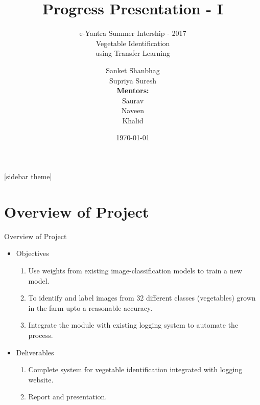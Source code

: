 \documentclass[10pt, a4paper,xcolor=table]{beamer}
\begin{document}
	\title{Progress Presentation - I}
	\subtitle{e-Yantra Summer Intership - 2017 \\ Vegetable Identification \\ using Transfer Learning}
	\author{Sanket Shanbhag\\Supriya Suresh\\
	\textbf{Mentors:} \\Saurav\\
	             Naveen\\Khalid}
	\date{\today}
	\frame{\titlepage}

[sidebar theme]
\section{Overview of Project}
\begin{frame}{Overview of Project}
	\begin{itemize}
		\item Objectives \\
		\begin{enumerate}
			\item Use weights from existing image-classification models to train a new model. 
			\item To identify and label images from 32 different classes (vegetables) grown in the farm upto a reasonable accuracy.
			\item Integrate the module with existing logging system to automate the process.
		\end{enumerate}
		\item Deliverables \\
		\begin{enumerate}
			\item Complete system for vegetable identification integrated with logging website.
			\item Report and presentation.
		\end{enumerate}
	\end{itemize}
\end{frame}
\end{document}

